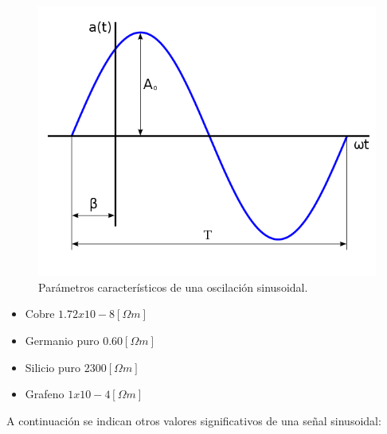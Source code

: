 \documentclass{article}
\begin{document}
\begin{figure}[ht!]
    \centering
    \includegraphics[scale=0.5]{Imagenes/600px-OndaSenoidal.png}
    \caption{Parámetros característicos de una oscilación sinusoidal.}
    \label{fig:ondaSenoidal}
\end{figure}



\begin{itemize}
    \item Cobre $1.72 x 10-8 [\Omega m]$ \citep{RS}
    \item Germanio puro  $0.60 [\Omega m]$ \citep{RS}
\item Silicio puro $2300 [\Omega m]$ \citep{RS}
\item  Grafeno $1 x 10-4 [\Omega m]$ \citep{Graf}
\end{itemize}



A continuación se indican otros valores significativos de una señal sinusoidal:
\end{document}
